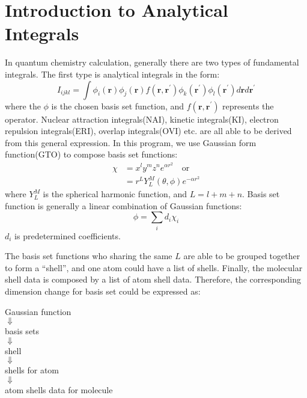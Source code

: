 \section{Introduction to Analytical Integrals}
%
%
In quantum chemistry calculation, generally there are two types of 
fundamental integrals. The first type is analytical integrals in the 
form:
\begin{equation}
  I_{ijkl} = \int \phi_{i}(\bm{r})\phi_{j}(\bm{r})f(\bm{r},\bm{r^{'}})
\phi_{k}(\bm{r^{'}})\phi_{l}(\bm{r^{'}}) d\bm{r} d\bm{r^{'}}
\end{equation}
where the $\phi$ is the chosen basis set function, and $f(\bm{r},\bm{r^{'}})$
represents the operator. Nuclear attraction integrals(NAI), kinetic integrals(KI),
electron repulsion integrals(ERI), overlap integrals(OVI) etc. are all able to be 
derived from this general expression. In this program, we use Gaussian form 
function(GTO) to compose basis set functions\cite{levine,szabo,
Davidson_Feller_CR_86_681_1986}:
\begin{align}
 \chi &= x^{l}y^{m}z^{n}e^{\alpha r^{2}} \quad \text{or} \nonumber \\
      &= r^{L}Y_{L}^{M}(\theta,\phi)e^{-\alpha r^{2}} 
\end{align}
where $Y_{L}^{M}$ is the spherical harmonic function, and $L = l+m+n$.
Basis set function is generally a linear combination of Gaussian functions:
\begin{equation}
 \phi = \sum_{i}d_{i}\chi_{i}
\end{equation}
$d_{i}$ is predetermined coefficients.

The basis set functions who sharing the same $L$ are able to be grouped together to 
form a ``shell'', and one atom could have a list of shells. Finally, the molecular
shell data is composed by a list of atom shell data. Therefore, the corresponding 
dimension change for basis set could be expressed as:
\begin{center}
 Gaussian function \\
 $\Downarrow$ \\
 basis sets \\
 $\Downarrow$ \\
 shell \\
 $\Downarrow$ \\
 shells for atom \\
 $\Downarrow$ \\
 atom shells data for molecule
\end{center}

